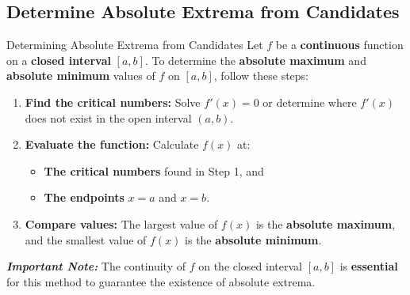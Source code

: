 \documentclass[12pt]{article}
\theoremstyle{beautifulthm}
\begin{document}
\subsection{Determine Absolute Extrema from Candidates}
\begin{Note}{Determining Absolute Extrema from Candidates}{}
\vspace{2mm}
\noindent
Let \( f \) be a \textbf{continuous} function on a \textbf{closed interval} \( [a, b] \). To determine the \textbf{absolute maximum} and \textbf{absolute minimum} values of \( f \) on \( [a, b] \), follow these steps:

\begin{enumerate}
    \item \textbf{Find the critical numbers:} Solve \( f'(x) = 0 \) or determine where \( f'(x) \) does not exist in the open interval \( (a, b) \).
    \item \textbf{Evaluate the function:} Calculate \( f(x) \) at:
    \begin{itemize}
        \item \textbf{The critical numbers} found in Step 1, and
        \item \textbf{The endpoints} \( x = a \) and \( x = b \).
    \end{itemize}
    \item \textbf{Compare values:} The largest value of \( f(x) \) is the \textbf{\color{red}absolute maximum}, and the smallest value of \( f(x) \) is the \textbf{\color{blue}absolute minimum}.
\end{enumerate}
\vspace{3mm}
\noindent
\textit{\textbf{Important Note:}} The continuity of \( f \) on the closed interval \( [a, b] \) is \textbf{essential} for this method to guarantee the existence of absolute extrema.
\end{Note}
\end{document}
